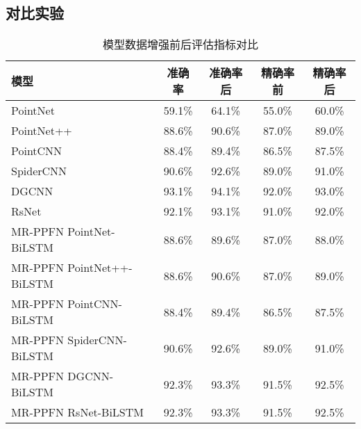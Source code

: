 \subsection{对比实验}
\begin{table}[htbp]
    \centering
    \caption{模型数据增强前后评估指标对比}
    \label{tab:model-comparison}
    \begin{tabular}{lcccc}
        \toprule
        \textbf{模型} & \textbf{准确率} & \textbf{准确率后} & \textbf{精确率前} & \textbf{精确率后} \\
        \midrule
        PointNet & 59.1\% & 64.1\% & 55.0\% & 60.0\% \\
        PointNet++ & 88.6\% & 90.6\% & 87.0\% & 89.0\% \\
        PointCNN & 88.4\% & 89.4\% & 86.5\% & 87.5\% \\
        SpiderCNN & 90.6\% & 92.6\% & 89.0\% & 91.0\% \\
        DGCNN & 93.1\% & 94.1\% & 92.0\% & 93.0\% \\
        RsNet & 92.1\% & 93.1\% & 91.0\% & 92.0\% \\
        MR-PPFN PointNet-BiLSTM & 88.6\% & 89.6\% & 87.0\% & 88.0\% \\
        MR-PPFN PointNet++-BiLSTM & 88.6\% & 90.6\% & 87.0\% & 89.0\% \\
        MR-PPFN PointCNN-BiLSTM & 88.4\% & 89.4\% & 86.5\% & 87.5\% \\
        MR-PPFN SpiderCNN-BiLSTM & 90.6\% & 92.6\% & 89.0\% & 91.0\% \\
        MR-PPFN DGCNN-BiLSTM & 92.3\% & 93.3\% & 91.5\% & 92.5\% \\
        MR-PPFN RsNet-BiLSTM & 92.3\% & 93.3\% & 91.5\% & 92.5\% \\
        \bottomrule
    \end{tabular}
\end{table}
 



